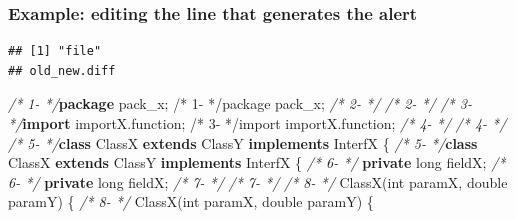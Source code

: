 \documentclass[
]{article}
\newenvironment{Shaded}{\begin{snugshade}}{\end{snugshade}}
\newcommand{\CommentTok}[1]{\textcolor[rgb]{0.56,0.35,0.01}{\textit{#1}}}
\newcommand{\DataTypeTok}[1]{\textcolor[rgb]{0.13,0.29,0.53}{#1}}
\newcommand{\FunctionTok}[1]{\textcolor[rgb]{0.00,0.00,0.00}{#1}}
\newcommand{\ImportTok}[1]{#1}
\newcommand{\KeywordTok}[1]{\textcolor[rgb]{0.13,0.29,0.53}{\textbf{#1}}}
\newcommand{\NormalTok}[1]{#1}
\begin{document}
\begin{landscape}

\subsubsection{Example: editing the line that generates the alert} \label{example_editing_line}

\small

\begin{verbatim}
## [1] "file"
## old_new.diff
\end{verbatim}

\normalsize

\scriptsize

\begin{Shaded}
\begin{Highlighting}[]
\CommentTok{/*  1-                 */}\KeywordTok{package}\ImportTok{ pack_x;                                                /*  1-                 */package pack_x;}                                                
\CommentTok{/*  2-                 */}                                                               \CommentTok{/*  2-                 */}                                                               
\CommentTok{/*  3-                 */}\KeywordTok{import}\ImportTok{ importX.function;                                       /*  3-                 */import importX.function;}                                       
\CommentTok{/*  4-                 */}                                                               \CommentTok{/*  4-                 */}                                                               
\CommentTok{/*  5-                 */}\KeywordTok{class}\NormalTok{ ClassX }\KeywordTok{extends}\NormalTok{ ClassY }\KeywordTok{implements}\NormalTok{ InterfX \{               }\CommentTok{/*  5-                 */}\KeywordTok{class}\NormalTok{ ClassX }\KeywordTok{extends}\NormalTok{ ClassY }\KeywordTok{implements}\NormalTok{ InterfX \{               }
\CommentTok{/*  6-                 */}    \KeywordTok{private} \DataTypeTok{long}\NormalTok{ fieldX;                                       }\CommentTok{/*  6-                 */}    \KeywordTok{private} \DataTypeTok{long}\NormalTok{ fieldX;                                       }
\CommentTok{/*  7-                 */}                                                               \CommentTok{/*  7-                 */}                                                               
\CommentTok{/*  8-                 */}    \FunctionTok{ClassX}\NormalTok{(}\DataTypeTok{int}\NormalTok{ paramX, }\DataTypeTok{double}\NormalTok{ paramY) \{                                }\CommentTok{/*  8-                 */}    \FunctionTok{ClassX}\NormalTok{(}\DataTypeTok{int}\NormalTok{ paramX, }\DataTypeTok{double}\NormalTok{ paramY) \{                                }

\end{Highlighting}
\end{Shaded}
\end{landscape}
\end{document}
